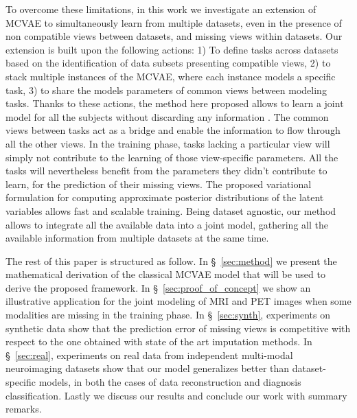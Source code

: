 To overcome these limitations, in this work we investigate an extension of MCVAE to simultaneously learn from multiple datasets, even in the presence of non compatible views between datasets, and missing views within datasets.
Our extension is built upon the following actions:
1) To define tasks across datasets based on the identification of data subsets presenting compatible views,
2) to stack multiple instances of the MCVAE, where each instance models a specific task,
3) to share the models parameters of common views between modeling tasks.
%
Thanks to these actions, the method here proposed allows to learn a joint model for all the subjects without discarding any information .
The common views between tasks act as a bridge and enable the information to flow through all the other views.
In the training phase, tasks lacking a particular view will simply not contribute to the learning of those view-specific parameters.
All the tasks will nevertheless benefit from the parameters they didn't contribute to learn, for the prediction of their missing views.
The proposed variational formulation for computing approximate posterior distributions of the latent variables allows fast and scalable training.
Being dataset agnostic, our method allows to integrate all the available data into a joint model, gathering  all the available information from multiple datasets at the same time.

The rest of this paper is structured as follow.
In \S~\ref{sec:method} we present the mathematical derivation of the classical MCVAE model that will be used to derive the proposed framework.
In \S~\ref{sec:proof_of_concept} we show an illustrative application for the joint modeling of MRI and PET images when some modalities are missing in the training phase.
In \S~\ref{sec:synth}, experiments on synthetic data show that the prediction error of missing views is competitive with respect to the one obtained with state of the art imputation methods.
In \S~\ref{sec:real}, experiments on real data from independent multi-modal neuroimaging datasets show that our model generalizes better than dataset-specific models, in both the cases of data reconstruction and diagnosis classification.
Lastly we discuss our results and conclude our work with summary remarks.

